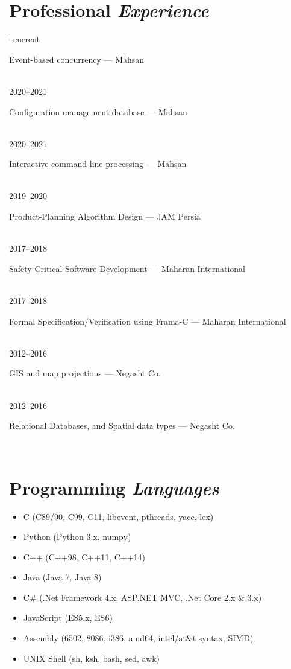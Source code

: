 \documentclass[a4paper,10pt]{article}
\newcommand{\follownote}[1]{--- {\footnotesize\color{darkblue}#1}}
\begin{document}
\section*{{\color{red}Professional \emph{Experience}}}
\begin{tabbing}
\hspace{2.5cm}\=--current \>\parbox[t]{10.5cm}{
	Event-based concurrency
	\follownote{Mahsan}
} \\[2mm]
2020--2021 \>\parbox[t]{10.5cm}{
	Configuration management database
	\follownote{Mahsan}
} \\[2mm]
2020--2021 \>\parbox[t]{10.5cm}{
	Interactive command-line processing
	\follownote{Mahsan}
} \\[2mm]
2019--2020 \>\parbox[t]{10.5cm}{
	Product-Planning Algorithm Design
	\follownote{JAM Persia}
} \\[2mm]
2017--2018 \>\parbox[t]{10.5cm}{
	Safety-Critical Software Development
	\follownote{Maharan International}
} \\[2mm]
2017--2018 \>\parbox[t]{10.5cm}{
	Formal Specification/Verification using Frama-C
	\follownote{Maharan International}
} \\[2mm]
2012--2016 \>\parbox[t]{10.5cm}{
	GIS and map projections
	\follownote{Negasht Co.}
} \\[2mm]
2012--2016 \>\parbox[t]{10.5cm}{
	Relational Databases, and Spatial data types
	\follownote{Negasht Co.}
} \\[2mm]
\end{tabbing}

\section*{{\color{purple}Programming \emph{Languages}}}
\begin{itemize}
	\item C (C89/90, C99, C11, libevent, pthreads, yacc, lex)
	\item Python (Python 3.x, numpy)
	\item C++ (C++98, C++11, C++14)
	\item Java (Java 7, Java 8)
	\item C\# (.Net Framework 4.x, ASP.NET MVC, .Net Core 2.x \& 3.x)
	\item JavaScript (ES5.x, ES6)
	\item Assembly (6502, 8086, i386, amd64, intel/at\&t syntax,
	    SIMD)
	\item UNIX Shell (sh, ksh, bash, sed, awk)
\end{itemize}
\end{document}

